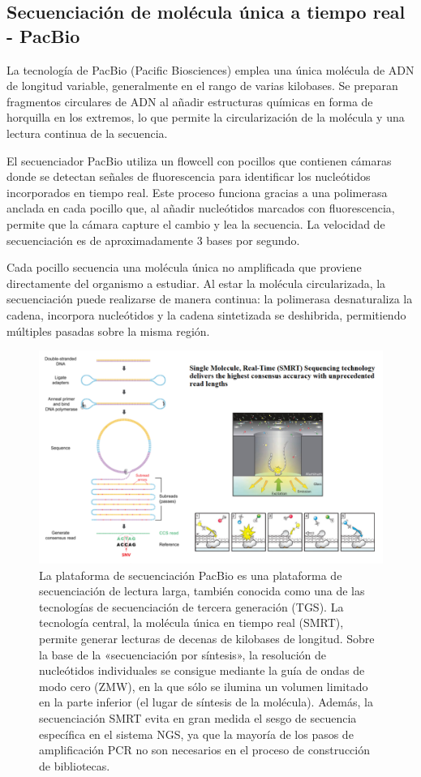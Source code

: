 \subsection{Secuenciación de molécula única a tiempo real - PacBio}
La tecnología de PacBio (Pacific Biosciences) emplea una única molécula de ADN de longitud variable, generalmente en el rango de varias kilobases. Se preparan fragmentos circulares de ADN al añadir estructuras químicas en forma de horquilla en los extremos, lo que permite la circularización de la molécula y una lectura continua de la secuencia.

El secuenciador PacBio utiliza un flowcell con pocillos que contienen cámaras donde se detectan señales de fluorescencia para identificar los nucleótidos incorporados en tiempo real. Este proceso funciona gracias a una polimerasa anclada en cada pocillo que, al añadir nucleótidos marcados con fluorescencia, permite que la cámara capture el cambio y lea la secuencia. La velocidad de secuenciación es de aproximadamente 3 bases por segundo.

Cada pocillo secuencia una molécula única no amplificada que proviene directamente del organismo a estudiar. Al estar la molécula circularizada, la secuenciación puede realizarse de manera continua: la polimerasa desnaturaliza la cadena, incorpora nucleótidos y la cadena sintetizada se deshibrida, permitiendo múltiples pasadas sobre la misma región.

\begin{figure}[htbp]
\centering
\includegraphics[width = \textwidth]{figs/pacbio.png}
\caption{La plataforma de secuenciación PacBio es una plataforma de secuenciación de lectura larga, también conocida como una de las tecnologías de secuenciación de tercera generación (TGS). La tecnología central, la molécula única en tiempo real (SMRT), permite generar lecturas de decenas de kilobases de longitud. Sobre la base de la «secuenciación por síntesis», la resolución de nucleótidos individuales se consigue mediante la guía de ondas de modo cero (ZMW), en la que sólo se ilumina un volumen limitado en la parte inferior (el lugar de síntesis de la molécula). Además, la secuenciación SMRT evita en gran medida el sesgo de secuencia específica en el sistema NGS, ya que la mayoría de los pasos de amplificación PCR no son necesarios en el proceso de construcción de bibliotecas.}
\end{figure}

